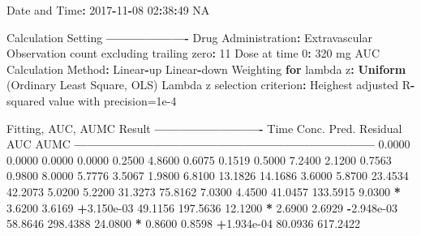 \documentclass[12pt,]{krantz}
\newenvironment{Shaded}{\begin{snugshade}}{\end{snugshade}}
\newcommand{\KeywordTok}[1]{\textcolor[rgb]{0.13,0.29,0.53}{\textbf{#1}}}
\newcommand{\DecValTok}[1]{\textcolor[rgb]{0.00,0.00,0.81}{#1}}
\newcommand{\FloatTok}[1]{\textcolor[rgb]{0.00,0.00,0.81}{#1}}
\newcommand{\StringTok}[1]{\textcolor[rgb]{0.31,0.60,0.02}{#1}}
\newcommand{\OtherTok}[1]{\textcolor[rgb]{0.56,0.35,0.01}{#1}}
\newcommand{\ControlFlowTok}[1]{\textcolor[rgb]{0.13,0.29,0.53}{\textbf{#1}}}
\newcommand{\OperatorTok}[1]{\textcolor[rgb]{0.81,0.36,0.00}{\textbf{#1}}}
\newcommand{\NormalTok}[1]{#1}
\theoremstyle{definition}
\theoremstyle{definition}
\theoremstyle{definition}
\theoremstyle{remark}
\begin{document}
\begin{Shaded}
\begin{Highlighting}[]
{{{{{{{{{{{{\NormalTok{Date and Time}\OperatorTok{:}\StringTok{ }\DecValTok{2017}\OperatorTok{-}\DecValTok{11}\OperatorTok{-}\DecValTok{08} \DecValTok{02}\OperatorTok{:}\DecValTok{38}\OperatorTok{:}\DecValTok{49} \OtherTok{NA}

\NormalTok{Calculation Setting}
\OperatorTok{-------------------}
\NormalTok{Drug Administration}\OperatorTok{:}\StringTok{ }\NormalTok{Extravascular}
\NormalTok{Observation count excluding trailing zero}\OperatorTok{:}\StringTok{ }\DecValTok{11}
\NormalTok{Dose at time }\DecValTok{0}\OperatorTok{:}\StringTok{ }\DecValTok{320}\NormalTok{ mg}
\NormalTok{AUC Calculation Method}\OperatorTok{:}\StringTok{ }\NormalTok{Linear}\OperatorTok{-}\NormalTok{up Linear}\OperatorTok{-}\NormalTok{down}
\NormalTok{Weighting }\ControlFlowTok{for}\NormalTok{ lambda z}\OperatorTok{:}\StringTok{ }\KeywordTok{Uniform}\NormalTok{ (Ordinary Least Square, OLS)}
\NormalTok{Lambda z selection criterion}\OperatorTok{:}\StringTok{ }\NormalTok{Heighest adjusted R}\OperatorTok{-}\NormalTok{squared value with precision=}\FloatTok{1e-4}


\NormalTok{Fitting, AUC, AUMC Result}
\OperatorTok{-------------------------}
\StringTok{      }\NormalTok{Time         Conc.      Pred.   Residual       AUC       AUMC}
\OperatorTok{---------------------------------------------------------------------}
\StringTok{     }\FloatTok{0.0000}       \FloatTok{0.0000}                           \FloatTok{0.0000}     \FloatTok{0.0000}
     \FloatTok{0.2500}       \FloatTok{4.8600}                           \FloatTok{0.6075}     \FloatTok{0.1519}
     \FloatTok{0.5000}       \FloatTok{7.2400}                           \FloatTok{2.1200}     \FloatTok{0.7563}
     \FloatTok{0.9800}       \FloatTok{8.0000}                           \FloatTok{5.7776}     \FloatTok{3.5067}
     \FloatTok{1.9800}       \FloatTok{6.8100}                          \FloatTok{13.1826}    \FloatTok{14.1686}
     \FloatTok{3.6000}       \FloatTok{5.8700}                          \FloatTok{23.4534}    \FloatTok{42.2073}
     \FloatTok{5.0200}       \FloatTok{5.2200}                          \FloatTok{31.3273}    \FloatTok{75.8162}
     \FloatTok{7.0300}       \FloatTok{4.4500}                          \FloatTok{41.0457}   \FloatTok{133.5915}
     \FloatTok{9.0300} \OperatorTok{*}\StringTok{     }\FloatTok{3.6200}     \FloatTok{3.6169} \OperatorTok{+}\FloatTok{3.150e-03}    \FloatTok{49.1156}   \FloatTok{197.5636}
    \FloatTok{12.1200} \OperatorTok{*}\StringTok{     }\FloatTok{2.6900}     \FloatTok{2.6929} \OperatorTok{-}\FloatTok{2.948e-03}    \FloatTok{58.8646}   \FloatTok{298.4388}
    \FloatTok{24.0800} \OperatorTok{*}\StringTok{     }\FloatTok{0.8600}     \FloatTok{0.8598} \OperatorTok{+}\FloatTok{1.934e-04}    \FloatTok{80.0936}   \FloatTok{617.2422}

}}}}}}}}}}}}
\end{Highlighting}
\end{Shaded}
\end{document}
